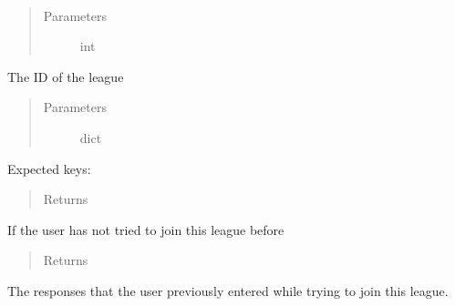 \documentclass[letterpaper,10pt,english]{sphinxmanual}
\begin{document}
\begin{fulllineitems}
\label{\detokenize{tiger_leagues/models/readme:tiger_leagues.models.league_model.get_previous_responses}}~\begin{quote}\begin{description}
\item[{Parameters}] \leavevmode
{} \textendash{} int

\end{description}\end{quote}

The ID of the league
\begin{quote}\begin{description}
\item[{Parameters}] \leavevmode
{} \textendash{} dict

\end{description}\end{quote}

Expected keys: 
\begin{quote}\begin{description}
\item[{Returns}] \leavevmode
{}

\end{description}\end{quote}

If the user has not tried to join this league before
\begin{quote}\begin{description}
\item[{Returns}] \leavevmode
{}

\end{description}\end{quote}

The responses that the user previously entered while trying to join this 
league.

\end{fulllineitems}

\end{document}
